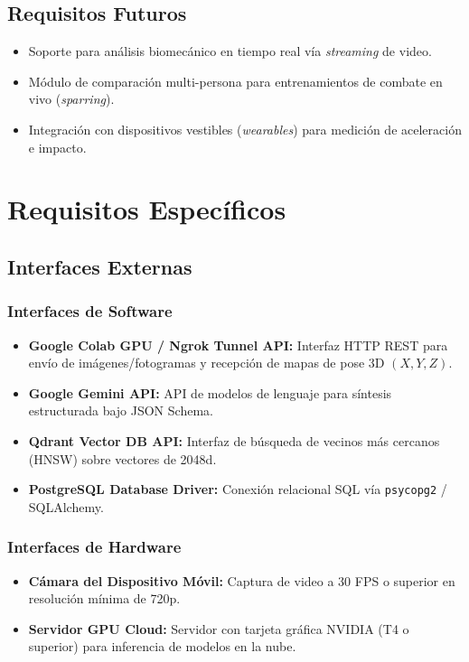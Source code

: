 \subsection{Requisitos Futuros}
\begin{itemize}
    \item Soporte para análisis biomecánico en tiempo real vía \textit{streaming} de video.
    \item Módulo de comparación multi-persona para entrenamientos de combate en vivo (\textit{sparring}).
    \item Integración con dispositivos vestibles (\textit{wearables}) para medición de aceleración e impacto.
\end{itemize}

\newpage

\section{Requisitos Específicos}

\subsection{Interfaces Externas}

\subsubsection{Interfaces de Software}
\begin{itemize}
    \item \textbf{Google Colab GPU / Ngrok Tunnel API:} Interfaz HTTP REST para envío de imágenes/fotogramas y recepción de mapas de pose 3D $(X, Y, Z)$.
    \item \textbf{Google Gemini API:} API de modelos de lenguaje para síntesis estructurada bajo JSON Schema.
    \item \textbf{Qdrant Vector DB API:} Interfaz de búsqueda de vecinos más cercanos (HNSW) sobre vectores de 2048d.
    \item \textbf{PostgreSQL Database Driver:} Conexión relacional SQL vía \texttt{psycopg2} / SQLAlchemy.
\end{itemize}

\subsubsection{Interfaces de Hardware}
\begin{itemize}
    \item \textbf{Cámara del Dispositivo Móvil:} Captura de video a 30 FPS o superior en resolución mínima de 720p.
    \item \textbf{Servidor GPU Cloud:} Servidor con tarjeta gráfica NVIDIA (T4 o superior) para inferencia de modelos en la nube.
\end{itemize}

